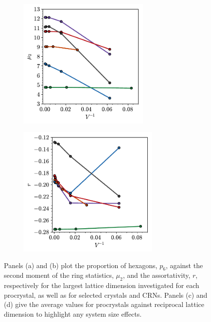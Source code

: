 \begin{figure}[bt]
     \vspace{2mm}
     \begin{subfigure}[b]{0.45\textwidth}
         \centering
         \includegraphics[height=6.5cm]{./figures/procrystals/pro3_ss_mu2_.pdf}
         \caption{}
         \label{fig:pro3p6ssmu2}
     \end{subfigure}
     \hspace{1cm}
        \begin{subfigure}[b]{0.45\textwidth}
         \centering
         \includegraphics[height=6.5cm]{./figures/procrystals/pro3_ss_r_.pdf}
         \caption{}
         \label{fig:pro3p6ssr}
     \end{subfigure}
     
     \caption{Panels (a) and (b) plot the proportion of hexagons, $p_6$, against the second moment of the ring statistics, $\mu_2$, and the assortativity, $r$, respectively for the largest lattice dimension investigated for each procrystal, as well as for selected crystals and CRNs. Panels (c) and (d) give the average values for procrystals against reciprocal lattice dimension to highlight any system size effects.}
     \label{fig:pro3p6mu2r}
\end{figure}

